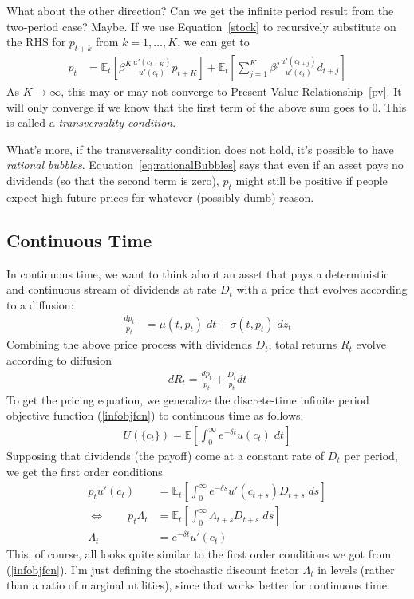 \documentclass[12pt]{article}
\theoremstyle{plain}
\theoremstyle{definition}
\theoremstyle{remark}
\begin{document}
What about the other direction? Can we get the infinite period result
from the two-period case? Maybe. If we use Equation~\ref{stock} to
recursively substitute on the RHS for $p_{t+k}$ from $k=1,\ldots,K$, we
can get to
\begin{align}
  p_t &=
  \mathbb{E}_t\left[
    \beta^K \frac{u'(c_{t+K})}{u'(c_t)} p_{t+K}
  \right]
  +\mathbb{E}_t\left[
    \sum^K_{j=1}
    \beta^j \frac{u'(c_{t+j})}{u'(c_t)} d_{t+j}
  \right]
  \label{eq:rationalBubbles}
\end{align}
As $K\rightarrow\infty$, this may or may not converge to Present Value
Relationship~\ref{pv}. It will only converge if we know that the first
term of the above sum goes to 0. This is called a \emph{transversality
condition}.

What's more, if the transversality condition does not hold, it's
possible to have \emph{rational bubbles}.
Equation~\ref{eq:rationalBubbles} says that even if an asset pays no
dividends (so that the second term is zero), $p_t$ might still be
positive if people expect high future prices for whatever (possibly
dumb) reason.

\subsection{Continuous Time}

In continuous time, we want to think about an asset that pays a
deterministic and continuous stream of dividends at rate $D_t$ with a
price that evolves according to a diffusion:
\begin{align*}
  \frac{dp_t}{p_t}
  &= \mu(t,p_t)\; dt + \sigma(t,p_t) \;dz_t
\end{align*}
Combining the above price process with dividends $D_t$, total returns
$R_t$ evolve according to diffusion
\begin{align*}
  dR_t = \frac{dp_t}{p_t} + \frac{D_t}{p_t}dt
\end{align*}
To get the pricing equation, we generalize the discrete-time infinite
period objective function (\ref{infobjfcn}) to continuous time as
follows:
\begin{align*}
  U(\{c_t\}) = \mathbb{E}
  \left[\int^\infty_0 e^{-\delta t} u(c_{t}) \; dt\right]
\end{align*}
Supposing that dividends (the payoff) come at a constant rate of $D_t$
per period, we get the first order conditions
\begin{align*}
  p_t u'(c_t)
  &=
  \mathbb{E}_t\left[
  \int^\infty_0 e^{-\delta s} u'(c_{t+s}) D_{t+s} \; ds
  \right] \\
  \Leftrightarrow \qquad
  p_t \Lambda_t
  &=
  \mathbb{E}_t\left[
  \int^\infty_0 \Lambda_{t+s} D_{t+s} \; ds
  \right]\\
  \Lambda_t &= e^{-\delta t}u'(c_t)
\end{align*}
This, of course, all looks quite similar to the first order conditions
we got from (\ref{infobjfcn}). I'm just defining the stochastic discount
factor $\Lambda_t$ in levels (rather than a ratio of marginal
utilities), since that works better for continuous time.
\end{document}
